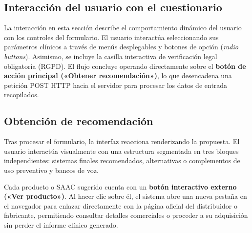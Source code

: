 
\subsection{Interacción del usuario con el cuestionario}
La interacción en esta sección describe el comportamiento dinámico del usuario con los controles del formulario. El usuario interactúa seleccionando sus parámetros clínicos a través de menús desplegables y botones de opción (\textit{radio buttons}). Asimismo, se incluye la casilla interactiva de verificación legal obligatoria (RGPD). El flujo concluye operando directamente sobre el \textbf{botón de acción principal («Obtener recomendación»)}, lo que desencadena una petición POST HTTP hacia el servidor para procesar los datos de entrada recopilados.


\subsection{Obtención de recomendación}
Tras procesar el formulario, la interfaz reacciona renderizando la propuesta. El usuario interactúa visualmente con una estructura segmentada en tres bloques independientes: sistemas finales recomendados, alternativas o complementos de uso preventivo y bancos de voz.

Cada producto o SAAC sugerido cuenta con un \textbf{botón interactivo externo («Ver producto»)}. Al hacer clic sobre él, el sistema abre una nueva pestaña en el navegador para enlazar directamente con la página oficial del distribuidor o fabricante, permitiendo consultar detalles comerciales o proceder a su adquisición sin perder el informe clínico generado.



